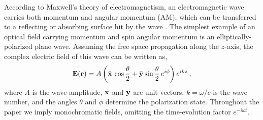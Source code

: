\documentclass[journal=apchd5,manuscript=article]{achemso}
\begin{document}


%
%
%



\hspace{1 cm}


According to Maxwell's theory of electromagnetism, an electromagnetic wave carries both momentum and angular momentum (AM), which can be transferred to a reflecting or absorbing surface hit by the wave \cite{Molina2007,loudon2012}.
The simplest example of an optical field carrying momentum and spin angular momentum is an elliptically-polarized plane wave. Assuming the free space propagation along the $z$-axis, the complex electric field of this wave can be written as,
\begin{equation}\label{planewave1}
{\bf E} ({\bf r}) = A \left( \bar {\bf x}\, \cos \frac{\theta}{2} + \bar {\bf y} \sin \frac{\theta}{2}\,  e^{i \phi}  \right) e^{i k z}\, ,
\end{equation}
where $A$ is the wave amplitude, $\bar {\bf x}$ and $\bar {\bf y}$ are unit vectors, $k = \omega/c$ is the wave number, and the angles $\theta$ and $\phi$ determine the polarization state. Throughout the paper we imply monochromatic fields, omitting the time-evolution factor $e^{-i \omega t}$.
\end{document}
